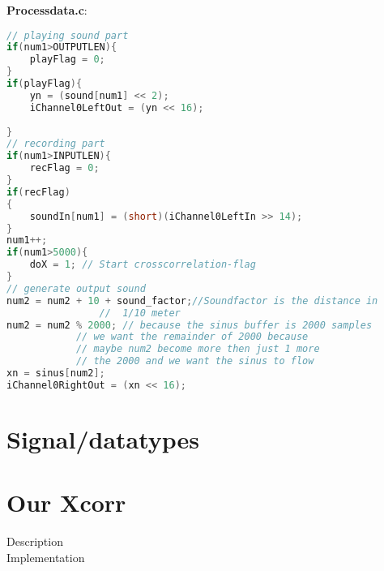 \textbf{Processdata.c}:\\
\begin{lstlisting}[language=C]
// playing sound part
if(num1>OUTPUTLEN){
	playFlag = 0;
}
if(playFlag){
	yn = (sound[num1] << 2);
	iChannel0LeftOut = (yn << 16);
		
}
// recording part
if(num1>INPUTLEN){
	recFlag = 0;
}
if(recFlag)
{
	soundIn[num1] = (short)(iChannel0LeftIn >> 14);
}
num1++;
if(num1>5000){
	doX = 1; // Start crosscorrelation-flag
}
// generate output sound
num2 = num2 + 10 + sound_factor;//Soundfactor is the distance in 
				//  1/10 meter
num2 = num2 % 2000;	// because the sinus buffer is 2000 samples
			// we want the remainder of 2000 because 
			// maybe num2 become more then just 1 more 
			// the 2000 and we want the sinus to flow
xn = sinus[num2];			
iChannel0RightOut = (xn << 16);
\end{lstlisting}
\section{Signal/datatypes}
\section{Our Xcorr}
Description\\
Implementation\\